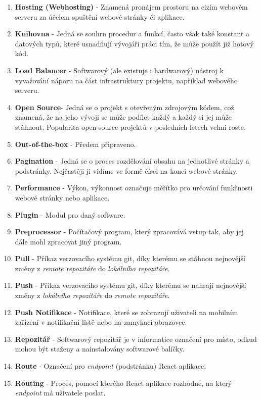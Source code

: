 \documentclass[12pt,a4paper]{report}
\begin{document}
\begin{enumerate}
    \item \textbf{Hosting (Webhosting)} - Znamená pronájem prostoru na cizím webovém serveru za účelem spuštění webové stránky či aplikace. 
    \item \textbf{Knihovna} - Jedná se souhrn procedur a funkcí, často však také konstant a datových typů, které usnadňují vývojáři práci tím, že může použít již hotový kód.
    \item \textbf{Load Balancer} - Softwarový (ale existuje i hardwarový) nástroj k vyvažování náporu na část infrastruktury projektu, například webového serveru.
    \item \textbf{Open Source}- Jedná se o projekt s otevřeným zdrojovým kódem, což znamená, že na jeho vývoji se může podílet každý a každý si jej může stáhnout. Popularita open-source projektů v posledních letech velmi roste.
    \item \textbf{Out-of-the-box} - Předem připraveno. 
    \item \textbf{Pagination} - Jedná se o proces rozdělování obsahu na jednotlivé stránky a podstránky. Nejčastěji ji vidíme ve formě čísel na konci webové stránky.
    \item \textbf{Performance} - Výkon, výkonnost označuje měřítko pro určování funkčnosti webové stránky nebo aplikace.
    \item \textbf{Plugin} - Modul pro daný software.
    \item \textbf{Preprocessor} - Počítačový program, který zpracovává vstup tak, aby jej dále mohl zpracovat jiný program.
    \item \textbf{Pull} - Příkaz verzovacího systému git, díky kterému se stáhnou nejnovější změny z \emph{remote repozitáře} do \emph{lokálního repozitáře}.
    \item \textbf{Push} - Příkaz verzovacího systému git, díky kterému se nahrají nejnovější změny z \emph{lokálního repozitáře} do \emph{remote repozitáře}.
    \item \textbf{Push Notifikace}  - Notifikace, které se zobrazují uživateli na mobilním zařízení v notifikační listě nebo na zamykací obrazovce.
    \item \textbf{Repozitář} - Softwarový repozitář je v informatice označení pro místo, odkud mohou být staženy a nainstalovány softwarové balíčky.
    \item \textbf{Route} - Označení pro \emph{endpoint} (podstránku) React aplikace.
    \item \textbf{Routing} - Proces, pomocí kterého React aplikace rozhodne, na který \emph{endpoint} má uživatele poslat.

\end{enumerate}
\end{document}

